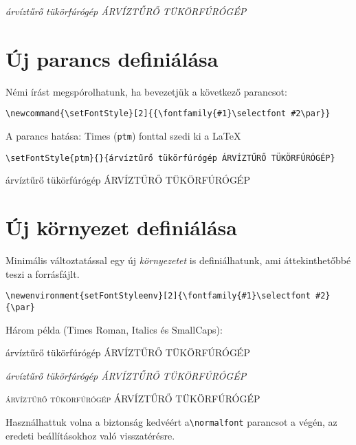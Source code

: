 \documentclass{article}
\begin{document}
{ \selectfont \itshape árvíztűrő tükörfúrógép ÁRVÍZTŰRŐ TÜKÖRFÚRÓGÉP\par}

\section{Új parancs definiálása}
Némi írást megspórolhatunk, ha bevezetjük a következő parancsot:

\verb!\newcommand{\setFontStyle}[2]{{\fontfamily{#1}\selectfont #2\par}}!

\newcommand{\setFontStyle}[2]{{\fontfamily{#1}\selectfont #2\par}}

 A parancs hatása: Times (\texttt{ptm}) fonttal szedi ki a \LaTeX

 \verb!\setFontStyle{ptm}{}{árvíztűrő tükörfúrógép ÁRVÍZTŰRŐ TÜKÖRFÚRÓGÉP}!
 
\setFontStyle{ptm}{}{árvíztűrő tükörfúrógép ÁRVÍZTŰRŐ TÜKÖRFÚRÓGÉP}

\section{Új környezet definiálása}
Minimális változtatással egy új \emph{környezetet} is definiálhatunk, ami áttekinthetőbbé teszi a forrásfájlt.

\verb!\newenvironment{setFontStyleenv}[2]{\fontfamily{#1}\selectfont #2}{\par}!

\newenvironment{setFontStyleenv}[2]{\fontfamily{#1}\selectfont #2}{\par}

Három példa (Times Roman, Italics és SmallCaps):

\begin{setFontStyleenv}{ptm}{\upshape}
	árvíztűrő tükörfúrógép ÁRVÍZTŰRŐ TÜKÖRFÚRÓGÉP
\end{setFontStyleenv}

\begin{setFontStyleenv}{ptm}{\itshape}
árvíztűrő tükörfúrógép ÁRVÍZTŰRŐ TÜKÖRFÚRÓGÉP
\end{setFontStyleenv}

\begin{setFontStyleenv}{ptm}{\scshape}
	árvíztűrő tükörfúrógép ÁRVÍZTŰRŐ TÜKÖRFÚRÓGÉP
\end{setFontStyleenv}


Használhattuk volna a biztonság kedvéért a\verb!\normalfont! parancsot a végén, az eredeti beállításokhoz való visszatérésre.
\end{document}

